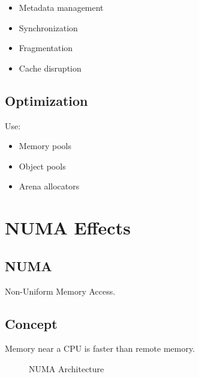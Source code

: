 \begin{itemize}
\item Metadata management
\item Synchronization
\item Fragmentation
\item Cache disruption
\end{itemize}

\subsection{Optimization}

Use:

\begin{itemize}
\item Memory pools
\item Object pools
\item Arena allocators
\end{itemize}

\section{NUMA Effects}

\subsection{NUMA}

Non-Uniform Memory Access.

\subsection{Concept}

Memory near a CPU is faster than remote memory.

\begin{figure}[h]
\centering
{}
\caption{NUMA Architecture}
\end{figure}

